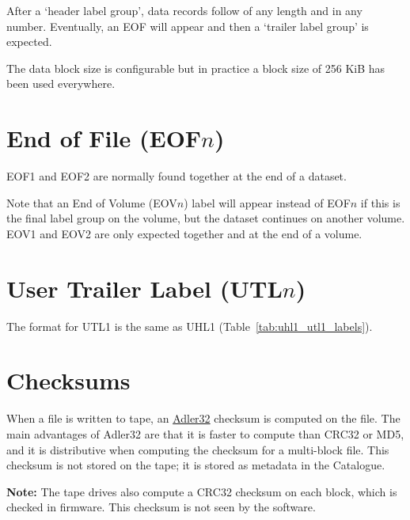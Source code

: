 After a `header label group', data records follow of any length and in any number. Eventually, an EOF will appear and
then a `trailer label group' is expected.

The data block size is configurable but in practice a block size of 256 KiB has been used everywhere.

\section{End of File (EOF$n$)}

EOF1 and EOF2 are normally found together at the end of a dataset.

Note that an End of Volume (EOV$n$) label will appear instead of EOF$n$ if this is the final label group on the volume,
but the dataset continues on another volume. EOV1 and EOV2 are only expected together and at the end of a volume.

\section{User Trailer Label (UTL$n$)}

The format for UTL1 is the same as UHL1 (Table~\ref{tab:uhl1_utl1_labels}).

\section{Checksums}

When a file is written to tape, an \href{http://www.zlib.net/manual.html#Checksum}{Adler32} checksum is computed on the
file. The main advantages of Adler32 are that it is faster to compute than CRC32 or MD5, and it is distributive when
computing the checksum for a multi-block file. This checksum is not stored on the tape; it is stored as metadata in the
Catalogue.

\textbf{Note:} The tape drives also compute a CRC32 checksum on each block, which is checked in firmware. This checksum
is not seen by the software.

